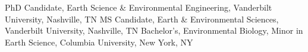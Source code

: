 %
%
%


\begin{scholarship}
					 {PhD Candidate, Earth Science \& Environmental Engineering, Vanderbilt University, Nashville, TN}
					 {MS Candidate, Earth \& Environmental Sciences, Vanderbilt University, Nashville, TN}
					 {Bachelor's, Environmental Biology, Minor in Earth Science, Columbia University, New York, NY}
\end{scholarship}